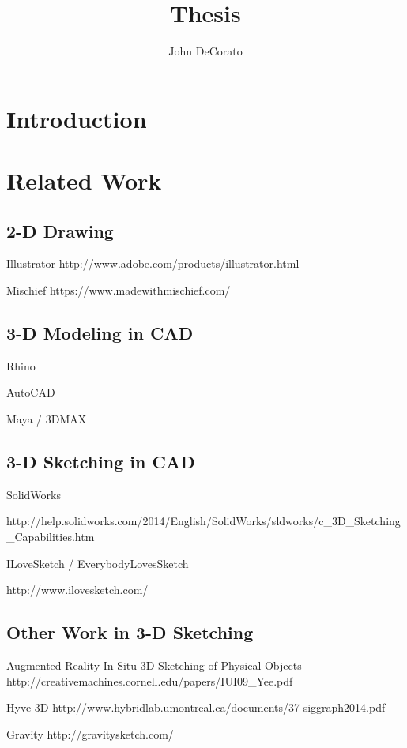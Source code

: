 \documentclass{article}
\title{Thesis}
\author{John DeCorato}
\date{ }
\begin{document}
 
\maketitle
 
\tableofcontents
 
\section{Introduction}

\section{Related Work}

\subsection{2-D Drawing}

Illustrator http://www.adobe.com/products/illustrator.html

Mischief https://www.madewithmischief.com/


\subsection{3-D Modeling in CAD}

Rhino

AutoCAD

Maya / 3DMAX

\subsection{3-D Sketching in CAD}

SolidWorks 

http://help.solidworks.com/2014/English/SolidWorks/sldworks/c_3D_Sketching_Capabilities.htm

ILoveSketch / EverybodyLovesSketch

http://www.ilovesketch.com/


\subsection{Other Work in 3-D Sketching}

Augmented Reality In-Situ 3D Sketching of Physical Objects http://creativemachines.cornell.edu/papers/IUI09_Yee.pdf

Hyve 3D http://www.hybridlab.umontreal.ca/documents/37-siggraph2014.pdf

Gravity http://gravitysketch.com/
\end{document}
